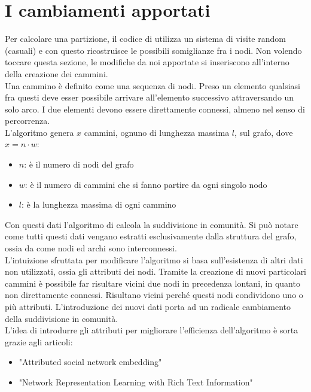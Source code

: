 \section{I cambiamenti apportati}
Per calcolare una partizione, il codice di \cnrl utilizza un sistema di visite random (casuali) e con questo ricostruisce le possibili somiglianze fra i nodi. Non volendo toccare questa sezione, le modifiche da noi apportate si inseriscono all'interno della creazione dei cammini.\\
Una cammino è definito come una sequenza di nodi. Preso un elemento qualsiasi fra questi deve esser possibile arrivare all'elemento successivo attraversando un solo arco. I due elementi devono essere direttamente connessi, almeno nel senso di percorrenza.\\
L'algoritmo genera $x$ cammini, ognuno di lunghezza massima $l$, sul grafo, dove $x=n \cdot w$:
\begin{itemize}
	\item $n$: è il numero di nodi del grafo
	\item $w$: è il numero di cammini che si fanno partire da ogni singolo nodo
	\item $l$: è la lunghezza massima di ogni cammino
\end{itemize}
%
Con questi dati l'algoritmo di \cnrl calcola la suddivisione in comunità. Si può notare come tutti questi dati vengano estratti esclusivamente dalla struttura del grafo, ossia da come nodi ed archi sono interconnessi.\\
L'intuizione sfruttata per modificare l'algoritmo si basa sull'esistenza di altri dati non utilizzati, ossia gli attributi dei nodi. Tramite la creazione di nuovi particolari cammini è possibile far risultare vicini due nodi in precedenza lontani, in quanto non direttamente connessi. Risultano vicini perché questi nodi condividono uno o più attributi. L'introduzione dei nuovi dati porta ad un radicale cambiamento della suddivisione in comunità.\\
L'idea di introdurre gli attributi per migliorare l'efficienza dell'algoritmo è sorta grazie agli articoli:
\begin{itemize}
	\item "Attributed social network embedding"\cite{SNE_paper}
	\item "Network Representation Learning with Rich Text Information"\cite{TADW_paper}
\end{itemize}
%
